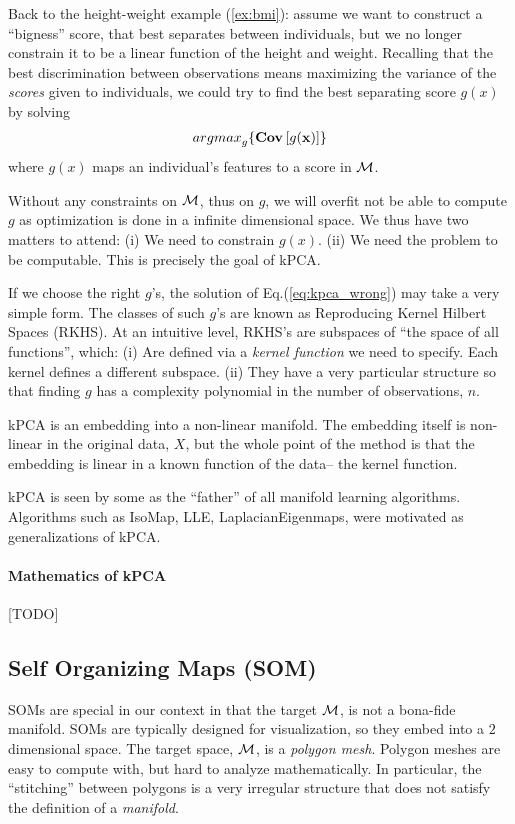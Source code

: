 \documentclass[12pt,a4paper]{article}
\begin{document}
Back to the height-weight example (\ref{ex:bmi}): assume we want to construct a ``bigness'' score, that best separates between individuals, but we no longer constrain it to be a linear function of the height and weight.
Recalling that the best discrimination between observations means maximizing the variance of the \emph{scores} given to individuals, we could try to find the best separating score $g(x)$ by solving 
\begin{align}
\label{eq:kpca_wrong}
	\textstyle{\mathop{argmax}_{g}}\{ \mathbf{Cov} \left[ g(\mathbf{x}) \right] \}
\end{align}
where $g(x)$ maps an individual's features to a score in $\mathcal{M}$.

Without any constraints on $\mathcal{M}$, thus on $g$, we will overfit \andor not be able to compute $g$ as optimization is done in a infinite dimensional space. 
We thus have two matters to attend:
(i) We need to constrain $g(x)$.
(ii) We need the problem to be computable.
This is precisely the goal of kPCA. 

If we choose the right $g$'s, the solution of Eq.(\ref{eq:kpca_wrong}) may take a very simple form. 
The classes of such $g$'s are known as Reproducing Kernel Hilbert Spaces (RKHS). 
At an intuitive level, RKHS's are subspaces of ``the space of all functions'', which:
(i) Are defined via a \emph{kernel function} we need to specify. Each kernel defines a different subspace. 
(ii) They have a very particular structure so that finding $g$ has a complexity polynomial in the number of observations, $n$. 

kPCA is an embedding into a non-linear manifold.
The embedding itself is non-linear in the original data, $X$, but the whole point of the method is that the embedding is linear in a known function of the data-- the kernel function.


\begin{remark}
	kPCA is seen by some as the ``father'' of all manifold learning algorithms. 
	Algorithms such as IsoMap, LLE, LaplacianEigenmaps, were motivated as generalizations of kPCA.
\end{remark}



\paragraph{Mathematics of kPCA}
[TODO]




\subsection{Self Organizing Maps (SOM)}
SOMs are special in our context in that the target $\mathcal{M}$, is not a bona-fide manifold. 
SOMs are typically designed for visualization, so they embed into a $2$ dimensional space. 
The target space, $\mathcal{M}$, is a \emph{polygon mesh}.
Polygon meshes are easy to compute with, but hard to analyze mathematically. 
In particular, the ``stitching'' between polygons is a very irregular structure that does not satisfy the definition of a \emph{manifold}.
\end{document}
